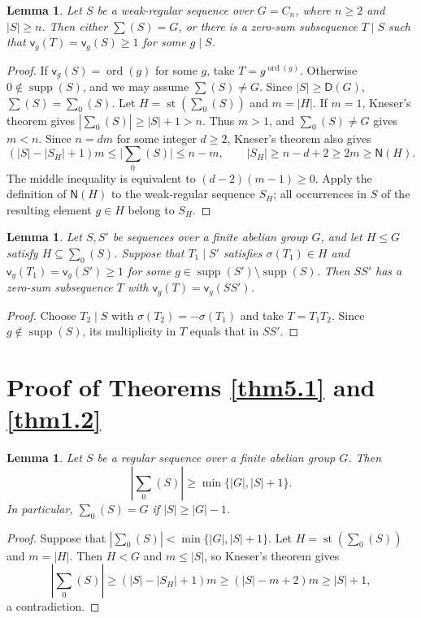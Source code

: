 \documentclass[10pt,a4paper]{amsart}
\newtheorem{lem}[thm]{Lemma}
\theoremstyle{definition}
\theoremstyle{remark}
\numberwithin{equation}{section}
\DeclareMathOperator{\ord}{ord}
\DeclareMathOperator{\supp}{supp}
\DeclareMathOperator{\st}{st}
\begin{document}
\begin{lem}\label{lem2.8}
Let $S$ be a weak-regular sequence over $G=C_n$, where $n\ge2$ and $|S|\ge n$.
Then either $\sum(S)=G$, or there is a zero-sum subsequence $T\mid S$
such that $\mathsf{v}_g(T)=\mathsf{v}_g(S)\ge1$ for some $g\mid S$.
\end{lem}
\begin{proof}
If $\mathsf{v}_g(S)=\ord(g)$ for some $g$, take $T=g^{\ord(g)}$.
Otherwise $0\notin\supp(S)$, and we may assume $\sum(S)\ne G$.
Since $|S|\ge \mathsf D(G)$, $\sum(S)=\sum_0(S)$.
Let $H=\st(\sum_0(S))$ and $m=|H|$.
If $m=1$, Kneser's theorem gives $|\sum_0(S)|\ge|S|+1>n$.
Thus $m>1$, and $\sum_0(S)\ne G$ gives $m<n$.
Since $n=dm$ for some integer $d\ge2$, Kneser's theorem also gives
\[
(|S|-|S_H|+1)m\le\bigl|\sum_0(S)\bigr|\le n-m,
\qquad
|S_H|\ge n-d+2\ge2m\ge\mathsf{N}(H).
\]
The middle inequality is equivalent to $(d-2)(m-1)\ge0$.
Apply the definition of $\mathsf{N}(H)$ to the weak-regular sequence $S_H$;
all occurrences in $S$ of the resulting element $g\in H$ belong to $S_H$.
\end{proof}

\begin{lem}\label{lem2.9}
Let $S,S'$ be sequences over a finite abelian group $G$, and let
$H\le G$ satisfy $H\subseteq\sum_0(S)$.
Suppose that $T_1\mid S'$ satisfies $\sigma(T_1)\in H$ and
$\mathsf{v}_g(T_1)=\mathsf{v}_g(S')\ge1$ for some
$g\in\supp(S')\setminus\supp(S)$.
Then $SS'$ has a zero-sum subsequence $T$ with
$\mathsf{v}_g(T)=\mathsf{v}_g(SS')$.
\end{lem}
\begin{proof}
Choose $T_2\mid S$ with $\sigma(T_2)=-\sigma(T_1)$ and take $T=T_1T_2$.
Since $g\notin\supp(S)$, its multiplicity in $T$ equals that in $SS'$.
\end{proof}

\section{Proof of Theorems \ref{thm5.1} and \ref{thm1.2}}


\begin{lem}\label{lem:c0-regular-sums}
Let $S$ be a regular sequence over a finite abelian group $G$. Then
\[
|\sum_0(S)|\ge \min\{|G|,|S|+1\}.
\]
In particular, $\sum_0(S)=G$ if $|S|\ge |G|-1$.
\end{lem}

\begin{proof}
Suppose that $|\sum_0(S)|<\min\{|G|,|S|+1\}$.
Let $H=\st(\sum_0(S))$ and $m=|H|$.
Then $H<G$ and $m\le |S|$, so Kneser's theorem gives
\[
|\sum_0(S)|\ge (|S|-|S_H|+1)m
\ge (|S|-m+2)m\ge |S|+1,
\]
a contradiction.
\end{proof}
\end{document}
